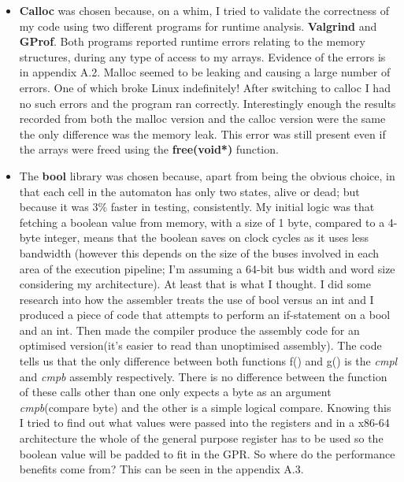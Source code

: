 \documentclass[11pt]{article} %
\begin{document}
\begin{itemize}
\item {\bf Calloc} was chosen because, on a whim, I tried to validate the correctness of my code using two different programs for runtime analysis. {\bf Valgrind} and {\bf GProf}. Both programs reported runtime errors relating to the memory structures, during any type of access to my arrays. Evidence of the errors is in appendix A.2. Malloc seemed to be leaking and causing a large number of errors. One of which broke Linux indefinitely! After switching to calloc I had no such errors and the program ran correctly. Interestingly enough the results recorded from both the malloc version and the calloc version were the same the only difference was the memory leak. This error was still present even if the arrays were freed using the {\bf free(void*)} function.
\item The {\bf bool} library was chosen because, apart from being the obvious choice, in that each cell in the automaton has only two states, alive or dead; but because it was 3\% faster in testing, consistently. My initial logic was that fetching a boolean value from memory, with a size of 1 byte, compared to a 4-byte integer, means that the boolean saves on clock cycles as it uses less bandwidth (however this depends on the size of the buses involved in each area of the execution pipeline; I'm assuming a 64-bit bus width and word size considering my architecture). At least that is what I thought. I did some research into how the assembler treats the use of bool versus an int and I produced a piece of code that attempts to perform an if-statement on a bool and an int. Then made the compiler produce the assembly code for an optimised version(it's easier to read than unoptimised assembly). The code tells us that the only difference between both functions f() and g() is the {\it cmpl} and {\it cmpb} assembly respectively. There is no difference between the function of these calls other than one only expects a byte as an argument {\it cmpb}(compare byte) and the other is a simple logical compare. Knowing this I tried to find out what values were passed into the registers and in a x86-64 architecture the whole of the general purpose register has to be used so the boolean value will be padded to fit in the GPR. So where do the performance benefits come from? This can be seen in the appendix A.3.
\end{itemize}
\end{document}
